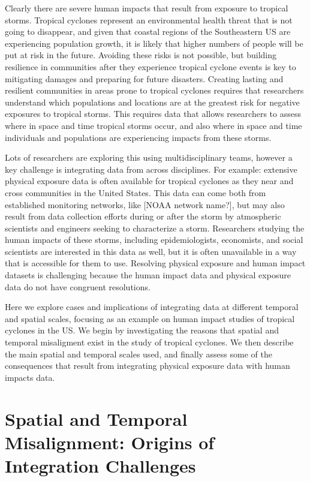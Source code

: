 \documentclass[]{article}
\begin{document}
Clearly there are severe human impacts that result from exposure to
tropical storms. Tropical cyclones represent an environmental health
threat that is not going to disappear, and given that coastal regions of
the Southeastern US are experiencing population growth, it is likely
that higher numbers of people will be put at risk in the future.
Avoiding these risks is not possible, but building resilience in
communities after they experience tropical cyclone events is key to
mitigating damages and preparing for future disasters. Creating lasting
and resilient communities in areas prone to tropical cyclones requires
that researchers understand which populations and locations are at the
greatest risk for negative exposures to tropical storms. This requires
data that allows researchers to assess where in space and time tropical
storms occur, and also where in space and time individuals and
populations are experiencing impacts from these storms.

Lots of researchers are exploring this using multidisciplinary teams,
however a key challenge is integrating data from across disciplines. For
example: extensive physical exposure data is often available for
tropical cyclones as they near and cross communities in the United
States. This data can come both from established monitoring networks,
like {[}NOAA network name?{]}, but may also result from data collection
efforts during or after the storm by atmospheric scientists and
engineers seeking to characterize a storm. Researchers studying the
human impacts of these storms, including epidemiologists, economists,
and social scientists are interested in this data as well, but it is
often unavailable in a way that is accessible for them to use. Resolving
physical exposure and human impact datasets is challenging because the
human impact data and physical exposure data do not have congruent
resolutions.

Here we explore cases and implications of integrating data at different
temporal and spatial scales, focusing as an example on human impact
studies of tropical cyclones in the US. We begin by investigating the
reasons that spatial and temporal misaligment exist in the study of
tropical cyclones. We then describe the main spatial and temporal scales
used, and finally assess some of the consequences that result from
integrating physical exposure data with human impacts data.

\section{Spatial and Temporal Misalignment: Origins of Integration
Challenges}\label{spatial-and-temporal-misalignment-origins-of-integration-challenges}
\end{document}
